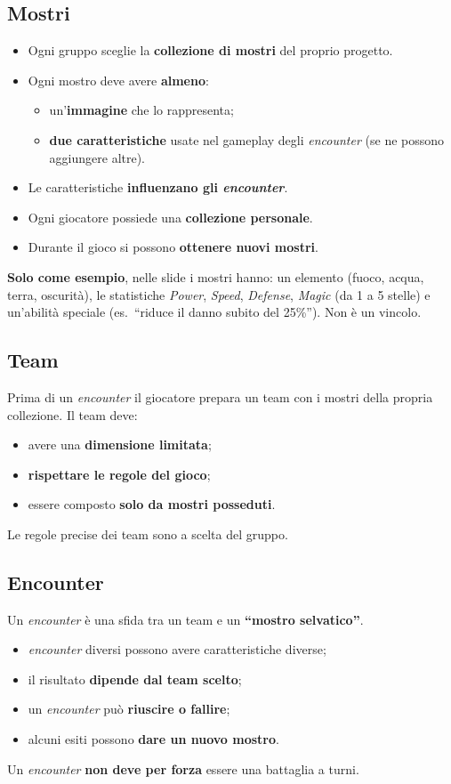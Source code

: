 \documentclass[11pt,a4paper]{article}
\newcommand{\enc}{\emph{encounter}}
\begin{document}
\subsection{Mostri}
\begin{itemize}
  \item Ogni gruppo sceglie la \textbf{collezione di mostri} del proprio progetto.
  \item Ogni mostro deve avere \textbf{almeno}:
    \begin{itemize}
      \item un'\textbf{immagine} che lo rappresenta;
      \item \textbf{due caratteristiche} usate nel gameplay degli \enc{} (se ne possono aggiungere altre).
    \end{itemize}
  \item Le caratteristiche \textbf{influenzano gli \enc}.
  \item Ogni giocatore possiede una \textbf{collezione personale}.
  \item Durante il gioco si possono \textbf{ottenere nuovi mostri}.
\end{itemize}
\begin{notebox}
\textbf{Solo come esempio}, nelle slide i mostri hanno: un elemento (fuoco, acqua, terra, oscurità),
le statistiche \emph{Power}, \emph{Speed}, \emph{Defense}, \emph{Magic} (da 1 a 5 stelle) e un'abilità speciale
(es.\ ``riduce il danno subito del 25\%''). Non è un vincolo.
\end{notebox}

\subsection{Team}
Prima di un \enc{} il giocatore prepara un team con i mostri della propria collezione. Il team deve:
\begin{itemize}
  \item avere una \textbf{dimensione limitata};
  \item \textbf{rispettare le regole del gioco};
  \item essere composto \textbf{solo da mostri posseduti}.
\end{itemize}
Le regole precise dei team sono a scelta del gruppo.

\subsection{Encounter}
Un \enc{} è una sfida tra un team e un \textbf{``mostro selvatico''}.
\begin{itemize}
  \item \enc{} diversi possono avere caratteristiche diverse;
  \item il risultato \textbf{dipende dal team scelto};
  \item un \enc{} può \textbf{riuscire o fallire};
  \item alcuni esiti possono \textbf{dare un nuovo mostro}.
\end{itemize}
Un \enc{} \textbf{non deve per forza} essere una battaglia a turni.
\end{document}
